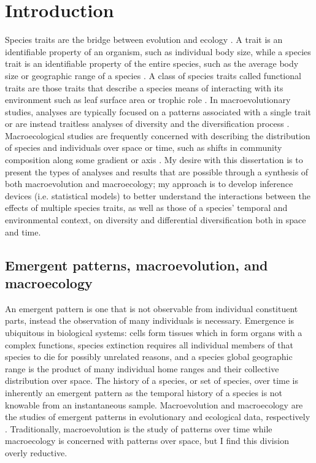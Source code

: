 \chapter{Introduction} \label{ch:intro}

Species traits are the bridge between evolution and ecology \citep{Mcgill2006,Weber2017}. A trait is an identifiable property of an organism, such as individual body size, while a species trait is an identifiable property of the entire species, such as the average body size or geographic range of a species \citep{Mcgill2006}. A class of species traits called functional traits are those traits that describe a species means of interacting with its environment such as leaf surface area or trophic role \citep{Mcgill2006}. In macroevolutionary studies, analyses are typically focused on a patterns associated with a single trait or are instead traitless analyses of diversity and the diversification process \citep{Silvestro2014a,Silvestro2015b,Pires2015a,Rabosky2013,Slater2015c,Hunt2007a,Hunt2006a,Liow2008,Payne2007}. Macroecological studies are frequently concerned with describing the distribution of species and individuals over space or time, such as shifts in community composition along some gradient or axis \citep{Smith2008b,Smith2004,Brown1995,Brown1989,Bush2007,Eronen2009,Fortelius2002,Jernvall2002,Jernvall2004}. My desire with this dissertation is to present the types of analyses and results that are possible through a synthesis of both macroevolution and macroecology; my approach is to develop inference devices (i.e. statistical models) to better understand the interactions between the effects of multiple species traits, as well as those of a species' temporal and environmental context, on diversity and differential diversification both in space and time.


\section{Emergent patterns, macroevolution, and macroecology}

An emergent pattern is one that is not observable from individual constituent parts, instead the observation of many individuals is necessary. Emergence is ubiquitous in biological systems: cells form tissues which in form organs with a complex functions, species extinction requires all individual members of that species to die for possibly unrelated reasons, and a species global geographic range is the product of many individual home ranges and their collective distribution over space. The history of a species, or set of species, over time is inherently an emergent pattern as the temporal history of a species is not knowable from an instantaneous sample. Macroevolution and macroecology are the studies of emergent patterns in evolutionary and ecological data, respectively \citep{Brown1989,Brown1995,Stanley1979,Stanley1975}. Traditionally, macroevolution is the study of patterns over time while macroecology is concerned with patterns over space, but I find this division overly reductive.

